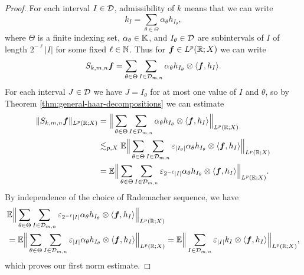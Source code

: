 \begin{proof}
  For each interval $I \in \mathcal{D}$, admissibility of $k$ means that we can write
  \begin{equation*}
    k_{I} = \sum_{\theta \in \Theta} \alpha_{\theta} h_{I_{\theta}},
  \end{equation*}
  where $\Theta$ is a finite indexing set, $\alpha_{\theta} \in \mathbb{K}$, and $I_{\theta} \in \mathcal{D}$ are subintervals of $I$ of length $2^{-\ell}|I|$ for some fixed $\ell \in \mathbb{N}$.
  Thus for $\bm{f} \in L^p(\mathbb{R};X)$ we can write
  \begin{equation*}
    \begin{aligned}
      S_{k,m,n}\bm{f} = \sum_{\theta \in \Theta}  \sum_{I \in \mathcal{D}_{m,n}} \alpha_{\theta} h_{I_{\theta}} \otimes \langle \bm{f}, h_{I} \rangle .
    \end{aligned}
  \end{equation*}
  For each interval $J \in \mathcal{D}$ we have $J = I_{\theta}$ for at most one value of $I$ and $\theta$, so by Theorem \ref{thm:general-haar-decompositions} we can estimate
  \begin{equation*}
    \begin{aligned}
      \|S_{k,m,n} \bm{f}\|_{L^p(\mathbb{R};X)}
      &= \Big\| \sum_{\theta \in \Theta} \sum_{I \in \mathcal{D}_{m,n}} \alpha_{\theta} h_{I_{\theta}} \otimes \langle \bm{f}, h_{I} \rangle \Big\|_{L^p(\mathbb{R};X)} \\
      &\lesssim_{p,X} \mathbb{E} \Big\| \sum_{\theta \in \Theta} \sum_{I \in \mathcal{D}_{m,n}} \varepsilon_{|I_{\theta}|} \alpha_{\theta} h_{I_{\theta}} \otimes \langle \bm{f}, h_{I} \rangle \Big\|_{L^p(\mathbb{R};X)} \\
      &= \mathbb{E} \Big\| \sum_{\theta \in \Theta} \sum_{I \in \mathcal{D}_{m,n}} \varepsilon_{2^{-\ell}|I|} \alpha_{\theta} h_{I_{\theta}} \otimes \langle \bm{f}, h_{I} \rangle \Big\|_{L^p(\mathbb{R};X)}.
    \end{aligned}
   \end{equation*}
   By independence of the choice of Rademacher sequence, we have
   \begin{equation*}
     \begin{aligned}
       &\mathbb{E} \Big\| \sum_{\theta \in \Theta} \sum_{I \in \mathcal{D}_{m,n}} \varepsilon_{2^{-\ell}|I|} \alpha_{\theta}  h_{I_{\theta}} \otimes \langle \bm{f}, h_{I} \rangle \Big\|_{L^p(\mathbb{R};X)} \\
       &= \mathbb{E} \Big\| \sum_{\theta \in \Theta} \sum_{I \in \mathcal{D}_{m,n}} \varepsilon_{|I|} \alpha_{\theta} h_{I_{\theta}} \otimes \langle \bm{f}, h_{I} \rangle \Big\|_{L^p(\mathbb{R};X)}
       = \mathbb{E} \Big\| \sum_{I \in \mathcal{D}_{m,n}} \varepsilon_{|I|} k_{I} \otimes \langle \bm{f}, h_{I} \rangle \Big\|_{L^p(\mathbb{R};X)},
     \end{aligned}
   \end{equation*}
   which proves our first norm estimate.


\end{proof}
